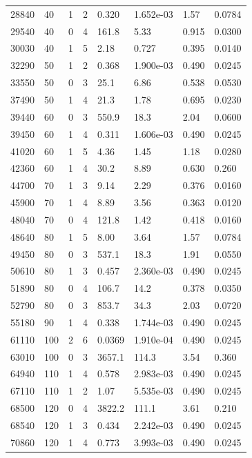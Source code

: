 \documentclass[preview]{standalone}
\begin{document}
{{\begin{tabular}{L{1.2cm}C{1.2cm} C{0.3cm}C{0.5cm} C{1.4cm}C{1.4cm} C{1.4cm}C{1.4cm}}
  28840  &    40  & 1     &  2 &  0.320  & 1.652e-03  & 1.57 &  0.0784   \\ 
  29540  &    40  & 0     &  4 &  161.8  & 5.33  & 0.915 &  0.0300   \\ 
  30030  &    40  & 1     &  5 &  2.18  & 0.727  & 0.395 &  0.0140   \\ 
  32290  &    50  & 1     &  2 &  0.368  & 1.900e-03  & 0.490 &  0.0245   \\ 
  33550  &    50  & 0     &  3 &  25.1  & 6.86  & 0.538 &  0.0530   \\ 
  37490  &    50  & 1     &  4 &  21.3  & 1.78  & 0.695 &  0.0230   \\ 
  39440  &    60  & 0     &  3 &  550.9  & 18.3  & 2.04 &  0.0600   \\ 
  39450  &    60  & 1     &  4 &  0.311  & 1.606e-03  & 0.490 &  0.0245   \\ 
  41020  &    60  & 1     &  5 &  4.36  & 1.45  & 1.18 &  0.0280   \\ 
  42360  &    60  & 1     &  4 &  30.2  & 8.89  & 0.630 &  0.260   \\ 
  44700  &    70  & 1     &  3 &  9.14  & 2.29  & 0.376 &  0.0160   \\ 
  45900  &    70  & 1     &  4 &  8.89  & 3.56  & 0.363 &  0.0120   \\ 
  48040  &    70  & 0     &  4 &  121.8  & 1.42  & 0.418 &  0.0160   \\ 
  48640  &    80  & 1     &  5 &  8.00  & 3.64  & 1.57 &  0.0784   \\ 
  49450  &    80  & 0     &  3 &  537.1  & 18.3  & 1.91 &  0.0550   \\ 
  50610  &    80  & 1     &  3 &  0.457  & 2.360e-03  & 0.490 &  0.0245   \\ 
  51890  &    80  & 0     &  4 &  106.7  & 14.2  & 0.378 &  0.0350   \\ 
  52790  &    80  & 0     &  3 &  853.7  & 34.3  & 2.03 &  0.0720   \\ 
  55180  &    90  & 1     &  4 &  0.338  & 1.744e-03  & 0.490 &  0.0245   \\ 
  61110  &   100  & 2     &  6 &  0.0369  & 1.910e-04  & 0.490 &  0.0245   \\ 
  63010  &   100  & 0     &  3 &  3657.1  & 114.3  & 3.54 &  0.360   \\ 
  64940  &   110  & 1     &  4 &  0.578  & 2.983e-03  & 0.490 &  0.0245   \\ 
  67110  &   110  & 1     &  2 &  1.07  & 5.535e-03  & 0.490 &  0.0245   \\ 
  68500  &   120  & 0     &  4 &  3822.2  & 111.1  & 3.61 &  0.210   \\ 
  68540  &   120  & 1     &  3 &  0.434  & 2.242e-03  & 0.490 &  0.0245   \\ 
  70860  &   120  & 1     &  4 &  0.773  & 3.993e-03  & 0.490 &  0.0245   \\ 
\hline 
\end{tabular} 

}}
\end{document}
